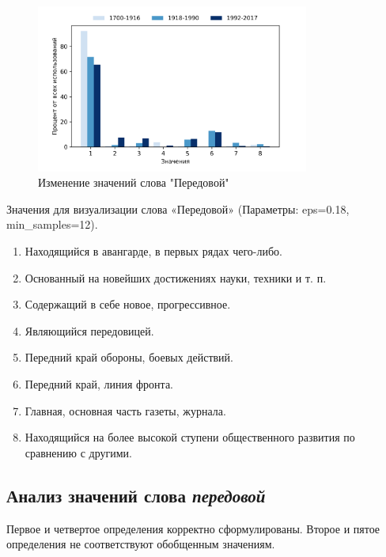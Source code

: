 \begin{figure}[H]
	\centering
	\includegraphics[width=0.8\textwidth]{img/visualizations/peredovoj_minimal}
	\caption{Изменение значений слова "Передовой"}
	\label{fig:Передовой}
\end{figure}

Значения для визуализации слова «Передовой» (Параметры: eps=0.18, min\_samples=12).

\begin{enumerate}
    \item Находящийся в авангарде, в первых рядах чего-либо.
    \item Основанный на новейших достижениях науки, техники и т. п.
    \item Содержащий в себе новое, прогрессивное.
    \item Являющийся передовицей.
    \item Передний край обороны, боевых действий.
    \item Передний край, линия фронта.
    \item Главная, основная часть газеты, журнала.
    \item Находящийся на более высокой ступени общественного развития по сравнению с другими.
\end{enumerate}

\subsection*{Анализ значений слова \textit{передовой}}

Первое и четвертое определения корректно сформулированы.
Второе и пятое определения не соответствуют обобщенным значениям.

